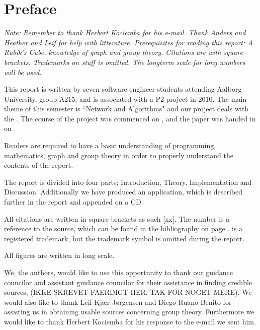 \chapter*{Preface}
\textit{Note: Remember to thank Herbert Kociemba for his e-mail. Thank Anders and Heather and Leif for help with litterature. Prerequisites for reading this report: A Rubik's Cube, knowledge of graph and group theory. Citations are with square brackets. Trademarks on stuff is omitted. The longterm scale for long numbers will be used.}

This report is written by seven software engineer students attending Aalborg University, group A215, and is associated with a P2 project in 2010.
The main theme of this semester is ``Network and Algorithms" and our project deals with the \rubik{}.
The course of the project was commenced on , and the paper was handed in on .

Readers are required to have a basic understanding of programming, mathematics, graph and group theory in order to properly understand the contents of the report. 

The report is divided into four parts; Introduction, Theory, Implementation and Discussion. 
Additionally we have produced an application, which is described further in the report and appended on a CD.

All citations are written in square brackets as such [xx]. The number is a reference to the source, which can be found in the bibliography on page \pageref{chap:bib}. 
\rubik{} is a registered trademark, but the trademark symbol is omitted during the report.

All figures are written in long scale.%

We, the authors, would like to use this opportunity to thank our guidance councilor and assistant guidance councilor for their assistance in finding credible sources, (IKKE SKREVET FAERDIGT HER. TAK FOR NOGET MERE).
We would also like to thank Leif Kj\ae{}r J\o{}rgensen and Diego Ruano Benito for assisting us in obtaining usable sources concerning group theory.
Furthermore we would like to thank Herbert Kociemba for his response to the e-mail we sent him.
